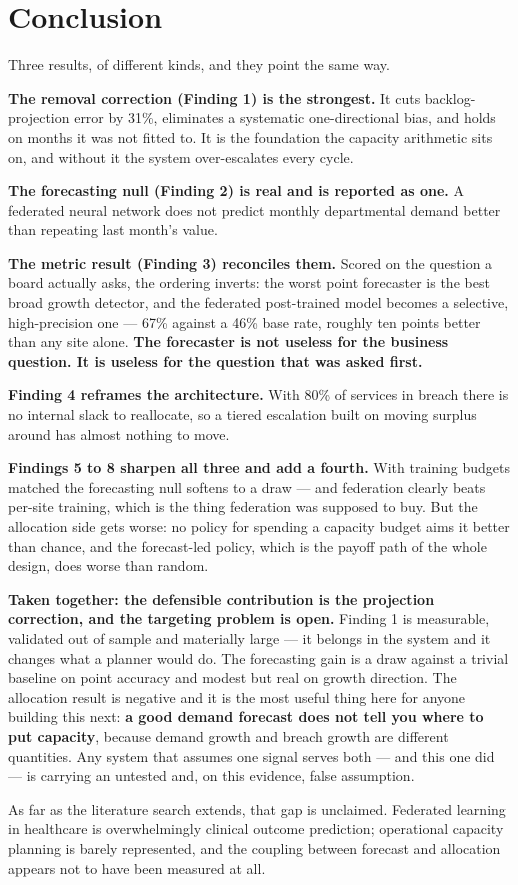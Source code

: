 \documentclass[11pt,a4paper]{article}
\newcommand{\keypoint}[1]{%
  \par\vspace{0.4em}%
  \noindent\colorbox{fed!8}{\parbox{0.98\textwidth}{\vspace{0.2em}#1\vspace{0.2em}}}%
  \par\vspace{0.4em}}
\begin{document}
\section{Conclusion}

Three results, of different kinds, and they point the same way.

\textbf{The removal correction (Finding 1) is the strongest.} It cuts backlog-projection error by 31\%,
eliminates a systematic one-directional bias, and holds on months it was not fitted to. It is the
foundation the capacity arithmetic sits on, and without it the system over-escalates every cycle.

\textbf{The forecasting null (Finding 2) is real and is reported as one.} A federated neural network
does not predict monthly departmental demand better than repeating last month's value.

\textbf{The metric result (Finding 3) reconciles them.} Scored on the question a board actually asks,
the ordering inverts: the worst point forecaster is the best broad growth detector, and the federated
post-trained model becomes a selective, high-precision one --- 67\% against a 46\% base rate, roughly
ten points better than any site alone. \textbf{The forecaster is not useless for the business question.
It is useless for the question that was asked first.}

\textbf{Finding 4 reframes the architecture.} With 80\% of services in breach there is no internal
slack to reallocate, so a tiered escalation built on moving surplus around has almost nothing to move.

\textbf{Findings 5 to 8 sharpen all three and add a fourth.} With training budgets matched the
forecasting null softens to a draw --- and federation clearly beats per-site training, which is the
thing federation was supposed to buy. But the allocation side gets worse: no policy for spending a
capacity budget aims it better than chance, and the forecast-led policy, which is the payoff path of
the whole design, does worse than random.

\keypoint{\textbf{Taken together: the defensible contribution is the projection correction, and the
targeting problem is open.} Finding 1 is measurable, validated out of sample and materially large ---
it belongs in the system and it changes what a planner would do. The forecasting gain is a draw against
a trivial baseline on point accuracy and modest but real on growth direction. The allocation result is
negative and it is the most useful thing here for anyone building this next: \textbf{a good demand
forecast does not tell you where to put capacity}, because demand growth and breach growth are
different quantities. Any system that assumes one signal serves both --- and this one did --- is
carrying an untested and, on this evidence, false assumption.

As far as the literature search extends, that gap is unclaimed. Federated learning in healthcare is
overwhelmingly clinical outcome prediction; operational capacity planning is barely represented, and
the coupling between forecast and allocation appears not to have been measured at all.}
\end{document}
